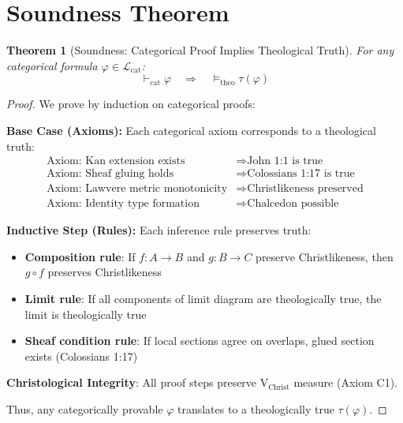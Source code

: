 \documentclass{article}
\newtheorem{theorem}{Theorem}
\begin{document}
\section{Soundness Theorem}

\begin{theorem}[Soundness: Categorical Proof Implies Theological Truth]
For any categorical formula $\varphi \in \mathcal{L}_{\text{cat}}$:
\[
\vdash_{\text{cat}} \varphi \quad \Rightarrow \quad \models_{\text{theo}} \tau(\varphi)
\]
\end{theorem}

\begin{proof}
We prove by induction on categorical proofs:

\textbf{Base Case (Axioms):} Each categorical axiom corresponds to a theological truth:
\begin{align*}
\text{Axiom: Kan extension exists} &\Rightarrow \text{John 1:1 is true} \\
\text{Axiom: Sheaf gluing holds} &\Rightarrow \text{Colossians 1:17 is true} \\
\text{Axiom: Lawvere metric monotonicity} &\Rightarrow \text{Christlikeness preserved} \\
\text{Axiom: Identity type formation} &\Rightarrow \text{Chalcedon possible}
\end{align*}

\textbf{Inductive Step (Rules):} Each inference rule preserves truth:
\begin{itemize}
    \item \textbf{Composition rule}: If $f: A \to B$ and $g: B \to C$ preserve Christlikeness, then $g \circ f$ preserves Christlikeness
    \item \textbf{Limit rule}: If all components of limit diagram are theologically true, the limit is theologically true
    \item \textbf{Sheaf condition rule}: If local sections agree on overlaps, glued section exists (Colossians 1:17)
\end{itemize}

\textbf{Christological Integrity}: All proof steps preserve $\mathrm{V}_{\text{Christ}}$ measure (Axiom C1).

Thus, any categorically provable $\varphi$ translates to a theologically true $\tau(\varphi)$.
\end{proof}
\end{document}
